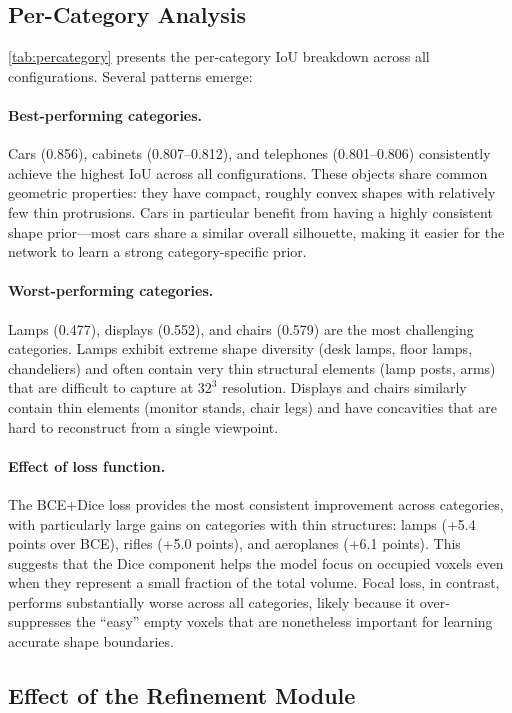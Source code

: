 \documentclass[10pt,twocolumn,letterpaper]{article}
\begin{document}
\subsection{Per-Category Analysis}

\cref{tab:percategory} presents the per-category IoU breakdown across all configurations. Several patterns emerge:

\paragraph{Best-performing categories.} Cars (0.856), cabinets (0.807--0.812), and telephones (0.801--0.806) consistently achieve the highest IoU across all configurations. These objects share common geometric properties: they have compact, roughly convex shapes with relatively few thin protrusions. Cars in particular benefit from having a highly consistent shape prior---most cars share a similar overall silhouette, making it easier for the network to learn a strong category-specific prior.

\paragraph{Worst-performing categories.} Lamps (0.477), displays (0.552), and chairs (0.579) are the most challenging categories. Lamps exhibit extreme shape diversity (desk lamps, floor lamps, chandeliers) and often contain very thin structural elements (lamp posts, arms) that are difficult to capture at $32^3$ resolution. Displays and chairs similarly contain thin elements (monitor stands, chair legs) and have concavities that are hard to reconstruct from a single viewpoint.

\paragraph{Effect of loss function.} The BCE+Dice loss provides the most consistent improvement across categories, with particularly large gains on categories with thin structures: lamps (+5.4 points over BCE), rifles (+5.0 points), and aeroplanes (+6.1 points). This suggests that the Dice component helps the model focus on occupied voxels even when they represent a small fraction of the total volume. Focal loss, in contrast, performs substantially worse across all categories, likely because it over-suppresses the ``easy'' empty voxels that are nonetheless important for learning accurate shape boundaries.

\subsection{Effect of the Refinement Module}
\end{document}
